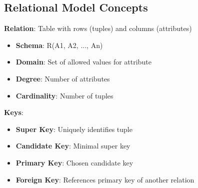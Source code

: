 \documentclass[12pt,a4paper]{report}
\begin{document}
\subsection{Relational Model Concepts}
\begin{concept}
\textbf{Relation}: Table with rows (tuples) and columns (attributes)
\begin{itemize}
    \item \textbf{Schema}: R(A1, A2, ..., An)
    \item \textbf{Domain}: Set of allowed values for attribute
    \item \textbf{Degree}: Number of attributes
    \item \textbf{Cardinality}: Number of tuples
\end{itemize}

\textbf{Keys}:
\begin{itemize}
    \item \textbf{Super Key}: Uniquely identifies tuple
    \item \textbf{Candidate Key}: Minimal super key
    \item \textbf{Primary Key}: Chosen candidate key
    \item \textbf{Foreign Key}: References primary key of another relation
\end{itemize}
\end{concept}
\end{document}
